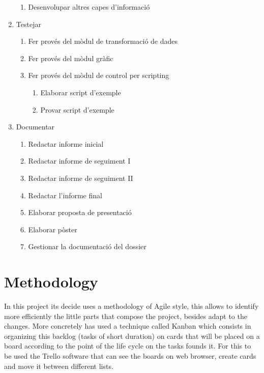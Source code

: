 \documentclass[10pt,a4paper,twocolumn,twoside]{article}
\begin{document}
\begin{enumerate}
\begin{enumerate}
  	\item Desenvolupar altres capes d'informació
  \end{enumerate}
  
  \item Testejar
  \begin{enumerate}
    \item Fer provés del mòdul de transformació de dades
    \item Fer provés del mòdul gràfic
    \item Fer provés del mòdul de control per scripting
    \begin{enumerate}
    	\item Elaborar script d'exemple
	    \item Provar script d'exemple
  	\end{enumerate}
  \end{enumerate}
  
  \item Documentar
  \begin{enumerate}
    \item Redactar informe inicial
    \item Redactar informe de seguiment I
    \item Redactar informe de seguiment II
    \item Redactar l'informe final
    \item Elaborar proposta de presentació
    \item Elaborar pòster
    \item Gestionar la documentació del dossier
  \end{enumerate}
  
\end{enumerate}

\section{Methodology}
In this project its decide uses a methodology of Agile\cite{agile} style, this allows to identify more efficiently the little parts that compose the project, besides adapt to the changes. More concretely has used a technique called Kanban\cite{kanban} which consists in organizing this backlog (tasks of short duration) on cards that will be placed on a board according to the point of the life cycle on the tasks founds it. For this to be used the Trello\cite{trello} software that can see the boards on web browser, create cards and move it between different lists.
\end{document}
